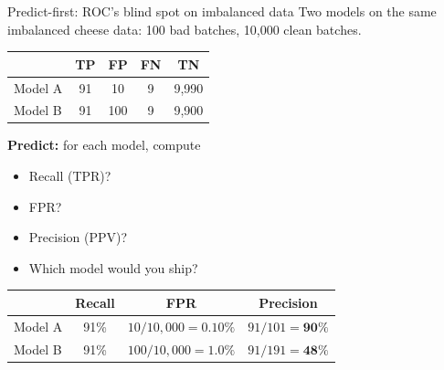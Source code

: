 \documentclass[aspectratio=169]{beamer}
\begin{document}
\begin{frame}{Predict-first: ROC's blind spot on imbalanced data}
  Two models on the same imbalanced cheese data: 100 bad batches, 10{,}000 clean batches.
  \vfill
  \begin{center}\small
    \begin{tabular}{lcccc}
      & \textbf{TP} & \textbf{FP} & \textbf{FN} & \textbf{TN} \\ \hline
      Model A & 91 & 10 & 9 & 9{,}990 \\
      Model B & 91 & 100 & 9 & 9{,}900 \\
    \end{tabular}
  \end{center}
  \vfill
  \textbf{Predict:} for each model, compute
  \begin{itemize}\small
    \item Recall (TPR)?
    \item FPR?
    \item Precision (PPV)?
    \item Which model would you ship?
  \end{itemize}
  \vfill
  \begin{center}\small
    \begin{tabular}{lccc}
      & \textbf{Recall} & \textbf{FPR} & \textbf{Precision} \\ \hline
      Model A & 91\% & $10/10{,}000 = \mathbf{0.10\%}$ & $91/101 = \mathbf{90\%}$ \\
      Model B & 91\% & $100/10{,}000 = \mathbf{1.0\%}$ & $91/191 = \mathbf{48\%}$ \\
    \end{tabular}
  \end{center}
  \vfill
\end{frame}
\end{document}
